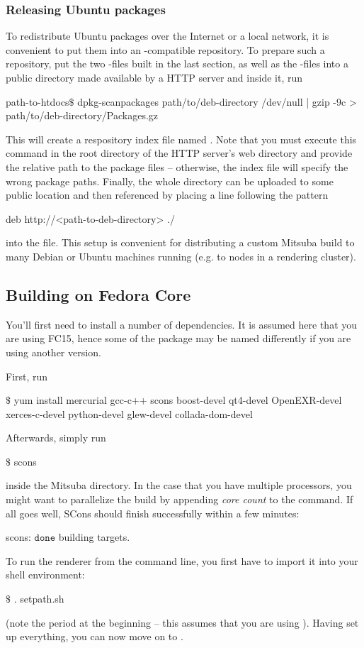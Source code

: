 \subsubsection{Releasing Ubuntu packages}
To redistribute Ubuntu packages over the Internet or a local network, it is convenient to 
put them into an -compatible repository. To prepare such a
repository, put the two -files built in the last section, 
as well as the  -files into a public directory 
made available by a HTTP server and inside it, run
\begin{shell}
path-to-htdocs$\text{\$}$ dpkg-scanpackages path/to/deb-directory /dev/null | gzip -9c > path/to/deb-directory/Packages.gz
\end{shell}
This will create a respository index file named .
Note that you must execute this command in the root directory of the
HTTP server's web directory and provide the relative path to the 
package files -- otherwise, the index file will specify the wrong package 
paths. Finally, the whole directory can be uploaded to some public location
and then referenced by placing a line following the pattern
\begin{shell}
deb http://<path-to-deb-directory> ./
\end{shell}
into the  file. This setup is convenient for
distributing a custom Mitsuba build to many Debian or Ubuntu machines running (e.g. to nodes in a rendering cluster).
\subsection{Building on Fedora Core}
You'll first need to install a number of dependencies. It is assumed here
that you are using FC15, hence some of the package may be named differently if you are 
using another version.

First, run
\begin{shell}
$\text{\$}$ yum install mercurial gcc-c++ scons boost-devel qt4-devel OpenEXR-devel xerces-c-devel python-devel glew-devel collada-dom-devel
\end{shell}
Afterwards, simply run
\begin{shell}
$\text{\$}$ scons
\end{shell}
inside the Mitsuba directory. In the case that you have multiple processors, you might want to parallelize the build by appending \emph{core count} to the command.
If all goes well, SCons should finish successfully within a few minutes:
\begin{shell}
scons: $\texttt{done}$ building targets.
\end{shell}
To run the renderer from the command line, you first have to import it into your shell environment:
\begin{shell}
$\text{\$}$ . setpath.sh
\end{shell}
(note the period at the beginning -- this assumes that you are using ).
Having set up everything, you can now move on to .

